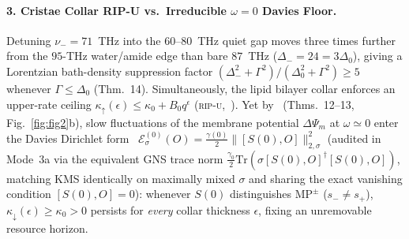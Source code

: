 \documentclass[10pt,twocolumn]{article}
\begin{document}
\paragraph{3. Cristae Collar RIP-U vs.\ Irreducible $\omega = 0$ Davies Floor.}
Detuning $\nu_- = 71$~THz into the $60$--$80$~THz quiet gap moves three times further from the $95$-THz water/amide edge than bare $87$~THz ($\Delta_- = 24 = 3\Delta_0$), giving a Lorentzian bath-density suppression factor $(\Delta_-^2+\Gamma^2)/(\Delta_0^2+\Gamma^2) \ge 5$ whenever $\Gamma \le \Delta_0$ (Thm.~14). Simultaneously, the lipid bilayer collar enforces an upper-rate ceiling $\kappa_\uparrow(\epsilon) \le \kappa_0 + B_0 q^\epsilon$ (\textsc{rip-u},~\cite{Eriksson2025GeometryMembranes}). Yet by~\cite{Eriksson2026RipUOmegaZero} (Thms.~12--13, Fig.~\ref{fig:fig2}b), slow fluctuations of the membrane potential $\Delta\Psi_m$ at $\omega \simeq 0$ enter the Davies Dirichlet form~\cite{Davies1974Markovian} $\mathcal{E}^{(0)}_\sigma(O) = \frac{\gamma(0)}{2}\|[S(0),O]\|^2_{2,\sigma}$ (audited in Mode~3a via the equivalent GNS trace norm $\frac{\gamma_0}{2}\mathrm{Tr}(\sigma[S(0),O]^\dagger[S(0),O])$, matching KMS identically on maximally mixed $\sigma$ and sharing the exact vanishing condition $[S(0),O]=0$): whenever $S(0)$ distinguishes $\mathrm{MP}^\pm$ ($s_- \neq s_+$), $\kappa_\downarrow(\epsilon) \ge \kappa_0 > 0$ persists for \emph{every} collar thickness $\epsilon$, fixing an unremovable resource horizon.
\end{document}
